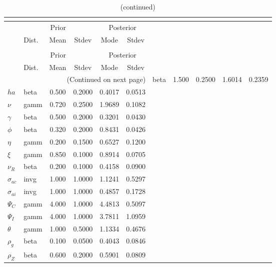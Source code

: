 
\begin{center}
\begin{longtable}{llcccc} 
\caption{Results from posterior maximization (parameters)}\\
 \label{Table:Posterior:1}\\
\toprule 
  & \multicolumn{3}{c}{Prior}  &  \multicolumn{2}{c}{Posterior} \\
  \cmidrule(r{.75em}){2-4} \cmidrule(r{.75em}){5-6}
  & Dist. & Mean  & Stdev & Mode & Stdev \\ 
\midrule \endfirsthead 
\caption{(continued)}\\
 \bottomrule 
  & \multicolumn{3}{c}{Prior}  &  \multicolumn{2}{c}{Posterior} \\
  \cmidrule(r{.75em}){2-4} \cmidrule(r{.75em}){5-6}
  & Dist. & Mean  & Stdev & Mode & Stdev \\ 
\midrule \endhead 
\bottomrule \multicolumn{6}{r}{(Continued on next page)}\endfoot 
\bottomrule\endlastfoot 
${\sigma}$ & beta &   1.500 & 0.2500 &   1.6014 &  0.2359 \\ 
${ha}$ & beta &   0.500 & 0.2000 &   0.4017 &  0.0513 \\ 
$\nu$ & gamm &   0.720 & 0.2500 &   1.9689 &  0.1082 \\ 
$\gamma$ & beta &   0.500 & 0.2000 &   0.3201 &  0.0430 \\ 
${\phi}$ & beta &   0.320 & 0.2000 &   0.8431 &  0.0426 \\ 
${\eta}$ & gamm &   0.200 & 0.1500 &   0.6527 &  0.1200 \\ 
$\xi$ & gamm &   0.850 & 0.1000 &   0.8914 &  0.0705 \\ 
${\nu_R}$ & beta &   0.200 & 0.1000 &   0.4158 &  0.0900 \\ 
${\sigma_{ac}}$ & invg &   1.000 & 1.0000 &   1.1241 &  0.5297 \\ 
${\sigma_{ai}}$ & invg &   1.000 & 1.0000 &   0.4857 &  0.1728 \\ 
${\Psi_{C}}$ & gamm &   4.000 & 1.0000 &   4.4813 &  0.5097 \\ 
${\Psi_I}$ & gamm &   4.000 & 1.0000 &   3.7811 &  1.0959 \\ 
${\theta}$ & gamm &   1.000 & 0.5000 &   1.1334 &  0.4676 \\ 
${\rho_g}$ & beta &   0.100 & 0.0500 &   0.4043 &  0.0846 \\ 
${\rho_Z}$ & beta &   0.600 & 0.2000 &   0.5901 &  0.0809 \\ 

\end{longtable}
\end{center}
